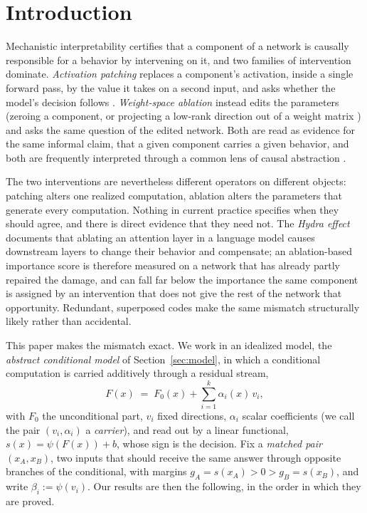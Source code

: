 \documentclass[11pt,a4paper]{article}
\begin{document}
\begin{abstract}
The single-block interaction result derived here extends past one residual
block, and the synthetic validation reported here is tested against a real
pretrained model, in a companion analysis that takes the present theory
further along both axes.
\end{abstract}

\section{Introduction}
\label{sec:intro}

Mechanistic interpretability certifies that a component of a network is
causally responsible for a behavior by intervening on it, and two families of
intervention dominate. \emph{Activation patching} replaces a component's
activation, inside a single forward pass, by the value it takes on a second
input, and asks whether the model's decision follows
\cite{vig2020,meng2022,wang2023}. \emph{Weight-space ablation} instead edits
the parameters (zeroing a component, or projecting a low-rank direction out
of a weight matrix \cite{arditi2024}) and asks the same question of the
edited network. Both are read as evidence for the same informal claim, that a
given component carries a given behavior, and both are frequently interpreted
through a common lens of causal abstraction \cite{geiger2021}.

The two interventions are nevertheless different operators on different
objects: patching alters one realized computation, ablation alters the
parameters that generate every computation. Nothing in current practice
specifies when they should agree, and there is direct evidence that they need
not. The \emph{Hydra effect} \cite{mcgrath2023} documents that ablating an
attention layer in a language model causes downstream layers to change their
behavior and compensate; an ablation-based importance score is therefore
measured on a network that has already partly repaired the damage, and can
fall far below the importance the same component is assigned by an
intervention that does not give the rest of the network that opportunity.
Redundant, superposed codes \cite{elhage2022} make the same mismatch
structurally likely rather than accidental.

This paper makes the mismatch exact. We work in an idealized model, the
\emph{abstract conditional model} of Section~\ref{sec:model}, in which a
conditional computation is carried additively through a residual stream,
\[
F(x) \;=\; F_0(x) + \sum_{i=1}^{k}\alpha_i(x)\,v_i,
\]
with $F_0$ the unconditional part, $v_i$ fixed directions, $\alpha_i$ scalar
coefficients (we call the pair $(v_i,\alpha_i)$ a \emph{carrier}), and read
out by a linear functional, $s(x)=\psi(F(x))+b$, whose sign is the decision.
Fix a \emph{matched pair} $(x_A,x_B)$, two inputs that should receive the
same answer through opposite branches of the conditional, with margins
$g_A=s(x_A)>0>g_B=s(x_B)$, and write $\beta_i:=\psi(v_i)$. Our results are
then the following, in the order in which they are proved.
\end{document}
